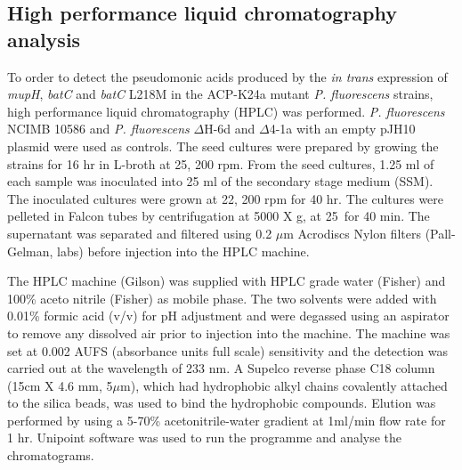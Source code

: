 		\subsection{High performance liquid chromatography analysis}
		\label{sec:hplc}
		To order to detect the pseudomonic acids produced by the \textit{in trans} expression of \textit{mupH}, \textit{batC} and \textit{batC} L218M in the ACP-K24a mutant \textit{P. fluorescens} strains, high performance liquid chromatography (HPLC)  was performed. \textit{P. fluorescens} NCIMB 10586 and \textit{P. fluorescens} $ \Delta $H-6d and $ \Delta $4-1a with an empty pJH10 plasmid were used as controls. The seed cultures were prepared by growing the strains for 16 hr in L-broth at 25\textcelsius, 200 rpm. From the seed cultures, 1.25 ml of each sample was inoculated into  25 ml of the secondary stage medium (SSM). The inoculated cultures were grown at 22\textcelsius, 200 rpm for 40 hr. The cultures were pelleted in Falcon tubes by centrifugation at 5000 X g, at 25\textcelsius \ for 40 min. The supernatant was separated and filtered using 0.2 $ \mu $m Acrodiscs Nylon filters (Pall-Gelman, labs) before injection into the HPLC machine.
		
		The HPLC machine (Gilson) was supplied with HPLC grade water (Fisher) and 100\% aceto nitrile (Fisher) as mobile phase. The two solvents were added with 0.01\% formic acid (v/v) for pH adjustment and were degassed using an aspirator to remove any dissolved air prior to injection into the machine. The machine was set at 0.002 AUFS  (absorbance units full scale)  sensitivity and the detection was carried out at the wavelength of 233 nm. A Supelco reverse phase C18 column (15cm X 4.6 mm, 5$ \mu $m), which had hydrophobic alkyl chains covalently attached to the silica beads, was used to bind the hydrophobic compounds. Elution was performed by using a 5-70\% acetonitrile-water gradient at 1ml/min flow rate for 1 hr. Unipoint software was used to run the programme and analyse the chromatograms. 
		
		
		
		
		
		
		
		
		
		
		
		
		